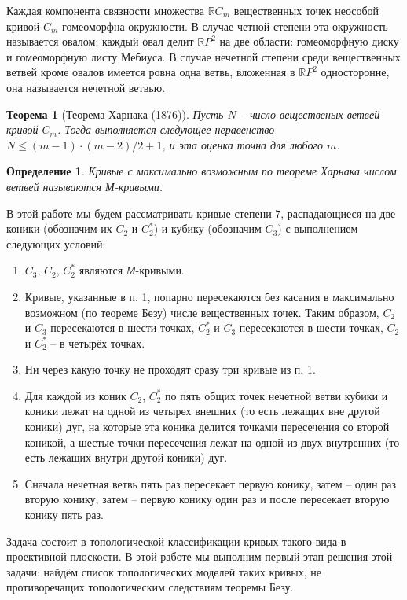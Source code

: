 \documentclass[11pt]{article}
\newtheorem{theorem}{Теорема}
\newtheorem{definition}{Определение}
\begin{document}
Каждая компонента связности множества  $\mathbb RC_m$ вещественных точек неособой кривой $C_m$ гомеоморфна окружности. В случае четной степени эта окружность называется овалом; каждый овал делит $\mathbb RP^2$ на две области: гомеоморфную диску и гомеоморфную листу Мебиуса. В случае нечетной степени среди вещественных ветвей кроме овалов имеется ровна одна ветвь, вложенная в $\mathbb RP^2$ односторонне, она называется нечетной ветвью.

\begin{theorem}[Теорема Харнака (1876)]
Пусть $N$ -- число вещественых ветвей кривой $C_m$. Тогда выполняется следующее неравенство $N \leqslant (m - 1) \cdot (m - 2)/2 + 1$, и эта оценка точна для любого $m$.
\end{theorem}

\begin{definition}
Кривые с максимально возможным по теореме Харнака числом ветвей называются М-кривыми.
\end{definition}

В этой работе мы будем рассматривать кривые степени 7, распадающиеся на две коники (обозначим их $C_2$ и $C_2^*$) и кубику (обозначим $C_3$) с выполнением следующих условий:

\begin{enumerate}
\item $C_3$, $C_2$, $C_2^*$ являются \textit{М}-кривыми.
\item Кривые, указанные в п. 1, попарно пересекаются без касания в максимально возможном (по теореме Безу) числе вещественных точек. Таким образом, $C_2$ и $C_3$ пересекаются в шести точках, $C_2^*$ и $C_3$ пересекаются в шести точках, $C_2$ и $C_2^*$ -- в  четырёх точках. 
\item Ни через какую точку не проходят сразу три кривые из п. 1.
\item Для каждой из коник $C_2$, $C_2^*$ по пять общих точек нечетной ветви кубики и коники лежат на одной из четырех внешних (то есть лежащих вне другой коники) дуг, на которые эта коника делится точками пересечения со второй коникой, а шестые точки пересечения лежат на одной из двух внутренних (то есть лежащих внутри другой коники) дуг.
\item Сначала нечетная ветвь пять раз пересекает первую конику, затем -- один раз вторую конику, затем -- первую конику один раз  и после пересекает вторую конику пять раз.
\end{enumerate}

Задача состоит в топологической классификации кривых такого вида в проективной плоскости. В этой работе мы выполним первый этап решения этой задачи: найдём список топологических моделей таких кривых, не противоречащих топологическим следствиям теоремы Безу.
\end{document}
